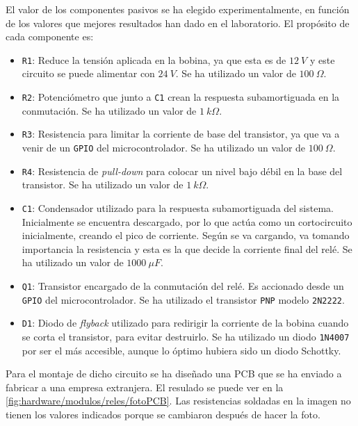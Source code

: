El valor de los componentes pasivos se ha elegido experimentalmente, en función de los valores que mejores resultados han dado en el laboratorio. El propósito de cada componente es:
\begin{itemize}
    \item \texttt{R1}: Reduce la tensión aplicada en la bobina, ya que esta es de $12\ V$ y este circuito se puede alimentar con $24\ V$. Se ha utilizado un valor de $100\ \Omega$.
    \item \texttt{R2}: Potenciómetro que junto a \texttt{C1} crean la respuesta subamortiguada en la conmutación. Se ha utilizado un valor de $1\ k\Omega$.
    \item \texttt{R3}: Resistencia para limitar la corriente de base del transistor, ya que va a venir de un \texttt{GPIO} del microcontrolador. Se ha utilizado un valor de $100\ \Omega$.
    \item \texttt{R4}: Resistencia de \textit{pull-down} para colocar un nivel bajo débil en la base del transistor. Se ha utilizado un valor de $1\ k\Omega$.
    \item \texttt{C1}: Condensador utilizado para la respuesta subamortiguada del sistema. Inicialmente se encuentra descargado, por lo que actúa como un cortocircuito inicialmente, creando el pico de corriente. Según se va cargando, va tomando importancia la resistencia y esta es la que decide la corriente final del relé. Se ha utilizado un valor de $1000\ \mu F$.
    \item \texttt{Q1}: Transistor encargado de la conmutación del relé. Es accionado desde un \texttt{GPIO} del microcontrolador. Se ha utilizado el transistor \texttt{PNP} modelo \texttt{2N2222}. 
    \item \texttt{D1}: Diodo de \textit{flyback} utilizado para redirigir la corriente de la bobina cuando se corta el transistor, para evitar destruirlo. Se ha utilizado un diodo \texttt{1N4007} por ser el más accesible, aunque lo óptimo hubiera sido un diodo Schottky.
\end{itemize}

Para el montaje de dicho circuito se ha diseñado una PCB que se ha enviado a fabricar a una empresa extranjera. El resulado se puede ver en la \autoref{fig:hardware/modulos/reles/fotoPCB}. Las resistencias soldadas en la imagen no tienen los valores indicados porque se cambiaron después de hacer la foto.

